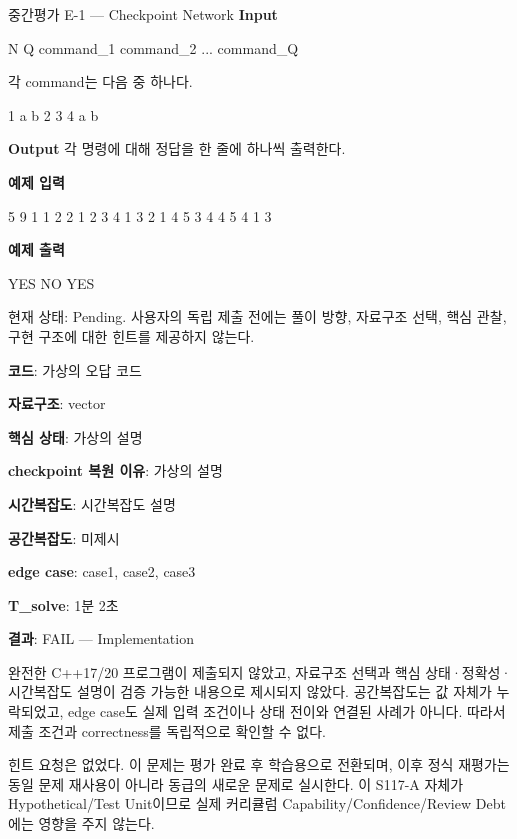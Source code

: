 \begin{problembox}{중간평가 E-1 --- Checkpoint Network}
\textbf{Input}
\begin{TextBlock}
N Q
command_1
command_2
...
command_Q
\end{TextBlock}

각 command는 다음 중 하나다.
\begin{TextBlock}
1 a b
2
3
4 a b
\end{TextBlock}

\textbf{Output}
각  명령에 대해 정답을 한 줄에 하나씩 출력한다.

\textbf{예제 입력}
\begin{TextBlock}
5 9
1 1 2
2
1 2 3
4 1 3
2
1 4 5
3
4 4 5
4 1 3
\end{TextBlock}

\textbf{예제 출력}
\begin{TextBlock}
YES
NO
YES
\end{TextBlock}
\end{problembox}

\begin{notebox}[평가 상태]
현재 상태: Pending. 사용자의 독립 제출 전에는 풀이 방향, 자료구조 선택, 핵심 관찰, 구현 구조에 대한 힌트를 제공하지 않는다.
\end{notebox}


\begin{answerbox}[학습자 제출 답안]
\textbf{코드}: 가상의 오답 코드

\textbf{자료구조}: vector

\textbf{핵심 상태}: 가상의 설명

\textbf{checkpoint 복원 이유}: 가상의 설명

\textbf{시간복잡도}: 시간복잡도 설명

\textbf{공간복잡도}: 미제시

\textbf{edge case}: case1, case2, case3

\textbf{T\_solve}: 1분 2초
\end{answerbox}

\begin{notebox}[중간평가 판정]
\textbf{결과}: FAIL --- Implementation

완전한 C++17/20 프로그램이 제출되지 않았고, 자료구조 선택과 핵심 상태·정확성·시간복잡도 설명이 검증 가능한 내용으로 제시되지 않았다. 공간복잡도는 값 자체가 누락되었고, edge case도 실제 입력 조건이나 상태 전이와 연결된 사례가 아니다. 따라서 제출 조건과 correctness를 독립적으로 확인할 수 없다.

힌트 요청은 없었다. 이 문제는 평가 완료 후 학습용으로 전환되며, 이후 정식 재평가는 동일 문제 재사용이 아니라 동급의 새로운 문제로 실시한다. 이 S117-A 자체가 Hypothetical/Test Unit이므로 실제 커리큘럼 Capability/Confidence/Review Debt에는 영향을 주지 않는다.
\end{notebox}


